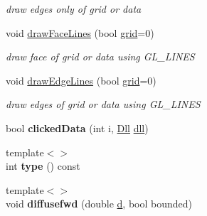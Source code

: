 \begin{DoxyCompactItemize}
\begin{DoxyCompactList}\small\item\em draw edges only of grid or data \end{DoxyCompactList}\item 
\hypertarget{classvsr_1_1_lattice_a0dc10710be2942a73ee58e5301a2ba97}{void \hyperlink{classvsr_1_1_lattice_a0dc10710be2942a73ee58e5301a2ba97}{draw\-Face\-Lines} (bool \hyperlink{classvsr_1_1_lattice_a85532086719166cc74662088b0173a4c}{grid}=0)}\label{classvsr_1_1_lattice_a0dc10710be2942a73ee58e5301a2ba97}

\begin{DoxyCompactList}\small\item\em draw face of grid or data using G\-L\-\_\-\-L\-I\-N\-E\-S \end{DoxyCompactList}\item 
\hypertarget{classvsr_1_1_lattice_a4660bebd2796e97172af4204987187fc}{void \hyperlink{classvsr_1_1_lattice_a4660bebd2796e97172af4204987187fc}{draw\-Edge\-Lines} (bool \hyperlink{classvsr_1_1_lattice_a85532086719166cc74662088b0173a4c}{grid}=0)}\label{classvsr_1_1_lattice_a4660bebd2796e97172af4204987187fc}

\begin{DoxyCompactList}\small\item\em draw edges of grid or data using G\-L\-\_\-\-L\-I\-N\-E\-S \end{DoxyCompactList}\item 
\hypertarget{classvsr_1_1_lattice_a88c0958ea2a8a8210609e786dbec6d3d}{bool {\bfseries clicked\-Data} (int i, \hyperlink{namespacevsr_a6c6892b7aec25cfb16492501e2e35b11}{Dll} \hyperlink{classvsr_1_1_frame_acfd841636abdd2ac35ef19c1fd611939}{dll})}\label{classvsr_1_1_lattice_a88c0958ea2a8a8210609e786dbec6d3d}

\item 
\hypertarget{classvsr_1_1_lattice_a7284d30e6894e2c12b7fd2e6ebb73767}{{\footnotesize template$<$$>$ }\\int {\bfseries type} () const}\label{classvsr_1_1_lattice_a7284d30e6894e2c12b7fd2e6ebb73767}

\item 
\hypertarget{classvsr_1_1_lattice_a1201415a36eebd66906cf59dda5f4bd7}{{\footnotesize template$<$$>$ }\\void {\bfseries diffusefwd} (double \hyperlink{classvsr_1_1_lattice_a5ee2e0d41d22764521a812a82074886b}{d}, bool bounded)}\label{classvsr_1_1_lattice_a1201415a36eebd66906cf59dda5f4bd7}


\end{DoxyCompactItemize}
